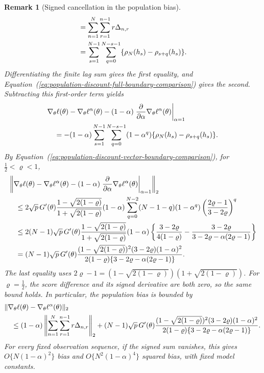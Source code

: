 \documentclass[11pt]{article}
\newtheorem{remark}{Remark}%
\theoremstyle{thmstylethree}%
\begin{document}
{\begin{remark}[Signed cancellation in the population bias]
\begin{align}
&=\sum_{n=1}^{N}\sum_{r=1}^{n-1}r\Delta_{n,r}                \notag\\
&=\sum_{s=1}^{N-1}\sum_{q=0}^{N-s-1}
\{\rho_N(h_s)-\rho_{s+q}(h_s)\}.
\label{eq:population-bias-signed-derivative}
\end{align}
Differentiating the finite lag sum gives the first equality, and
Equation~(\ref{eq:population-discount-full-boundary-comparison}) gives
the second. Subtracting this first-order term yields
\begin{align}
&\nabla_\theta\ell(\theta)-\nabla_\theta\ell^\alpha(\theta)
-(1-\alpha)
\left.\frac{\partial}{\partial\alpha}
\nabla_\theta\ell^\alpha(\theta)\right|_{\alpha=1}             \notag\\
&\quad=-(1-\alpha)\sum_{s=1}^{N-1}\sum_{q=0}^{N-s-1}
(1-\alpha^q)\{\rho_N(h_s)-\rho_{s+q}(h_s)\}.
\label{eq:population-bias-signed-remainder}
\end{align}
By Equation~(\ref{eq:population-discount-vector-boundary-comparison}),
for $\tfrac12<\varrho<1$,
\begin{align}
&\left\|
\nabla_\theta\ell(\theta)-\nabla_\theta\ell^\alpha(\theta)
-(1-\alpha)
\left.\frac{\partial}{\partial\alpha}
\nabla_\theta\ell^\alpha(\theta)\right|_{\alpha=1}
\right\|_2                                                   \notag\\*
&\quad\leq
2\sqrt p\,G'(\theta)\frac{1-\sqrt{2(1-\varrho)}}{1+\sqrt{2(1-\varrho)}}
(1-\alpha)\sum_{q=0}^{N-2}(N-1-q)(1-\alpha^q)
\left(\frac{2\varrho-1}{3-2\varrho}\right)^q                \notag\\
&\quad\leq
2(N-1)\sqrt p\,G'(\theta)\frac{1-\sqrt{2(1-\varrho)}}{1+\sqrt{2(1-\varrho)}}
(1-\alpha)
\left\{\frac{3-2\varrho}{4(1-\varrho)}
-\frac{3-2\varrho}{3-2\varrho-\alpha(2\varrho-1)}\right\}     \notag\\
&\quad=
(N-1)\sqrt p\,G'(\theta)
\frac{(1-\sqrt{2(1-\varrho)})^2(3-2\varrho)(1-\alpha)^2}
{2(1-\varrho)\{3-2\varrho-\alpha(2\varrho-1)\}}.
\label{eq:population-bias-signed-remainder-bound}
\end{align}
The last equality uses
$2\varrho-1=(1-\sqrt{2(1-\varrho)})(1+\sqrt{2(1-\varrho)})$.
For $\varrho=\tfrac12$, the score difference and its signed derivative are
both zero, so the same bound holds.
In particular, the population bias is bounded by
\begin{align}
&\|\nabla_\theta\ell(\theta)
-\nabla_\theta\ell^\alpha(\theta)\|_2                         \notag\\
&\quad\leq
(1-\alpha)
\left\|\sum_{n=1}^{N}\sum_{r=1}^{n-1}r\Delta_{n,r}\right\|_2
+
(N-1)\sqrt p\,G'(\theta)
\frac{(1-\sqrt{2(1-\varrho)})^2(3-2\varrho)(1-\alpha)^2}
{2(1-\varrho)\{3-2\varrho-\alpha(2\varrho-1)\}}.
\label{eq:population-bias-cancellation-bound}
\end{align}
For every fixed observation sequence, if the signed sum vanishes, this
gives $O\{N(1-\alpha)^2\}$ bias and $O\{N^2(1-\alpha)^4\}$ squared bias,
with fixed model constants.
\end{remark}
\endgraf
}
\endgraf
\end{document}
